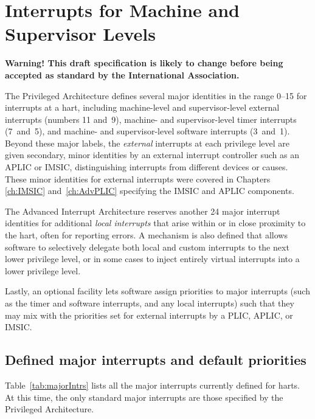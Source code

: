 
\chapter{Interrupts for Machine and Supervisor Levels}
\label{ch:MSLevel}

\textbf{%
Warning!
This draft specification is likely to change before being accepted as
standard by the {\RISCV} International Association.%
}
\bigskip

The {\RISCV} Privileged Architecture defines several major identities
in the range 0--15 for interrupts at a hart, including machine-level
and supervisor-level external interrupts (numbers 11 and~9), machine-
and supervisor-level timer interrupts (7~and~5), and machine- and
supervisor-level software interrupts (3~and~1).
Beyond these major labels, the \emph{external} interrupts at each
privilege level are given secondary, minor identities by an external
interrupt controller such as an APLIC or IMSIC, distinguishing interrupts
from different devices or causes.
These minor identities for external interrupts were covered in Chapters
\ref{ch:IMSIC} and~\ref{ch:AdvPLIC} specifying the IMSIC and
APLIC components.

The Advanced Interrupt Architecture reserves another 24 major
interrupt identities for additional \emph{local interrupts}
that arise within or in close proximity to the hart, often for
reporting errors.
A mechanism is also defined that allows software to
selectively delegate both local and custom interrupts to the next lower
privilege level, or in some cases to inject entirely virtual interrupts
into a lower privilege level.

Lastly, an optional facility lets software assign priorities to major
interrupts (such as the timer and software interrupts, and any local
interrupts) such that they may mix with the priorities set for external
interrupts by a PLIC, APLIC, or IMSIC.

\section{Defined major interrupts and default priorities}
\label{sec:majorIntrs}

Table~\ref{tab:majorIntrs} lists all the major interrupts
currently defined for {\RISCV} harts.
At this time, the only standard major interrupts are those
specified by the {\RISCV} Privileged Architecture.

